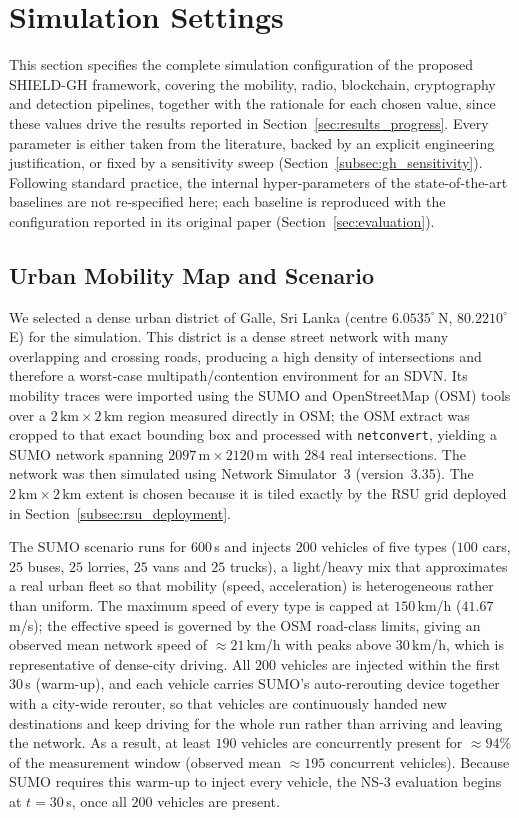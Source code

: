 \documentclass[12pt, a4paper]{report}
\begin{document}
\section{Simulation Settings}
\label{sec:sim_settings}

This section specifies the complete simulation configuration of the proposed
SHIELD-GH framework, covering the mobility, radio, blockchain, cryptography and
detection pipelines, together with the rationale for each chosen value, since
these values drive the results reported in Section~\ref{sec:results_progress}.
Every parameter is either taken from the literature, backed by an explicit
engineering justification, or fixed by a sensitivity sweep
(Section~\ref{subsec:gh_sensitivity}). Following standard practice, the internal
hyper-parameters of the state-of-the-art baselines are not re-specified here;
each baseline is reproduced with the configuration reported in its original
paper (Section~\ref{sec:evaluation}).

\subsection{Urban Mobility Map and Scenario}

We selected a dense urban district of Galle, Sri Lanka (centre
$6.0535^{\circ}$\,N, $80.2210^{\circ}$\,E) for the simulation. This district is
a dense street network with many overlapping and crossing roads, producing a
high density of intersections and therefore a worst-case multipath/contention
environment for an SDVN. Its mobility traces were imported using the SUMO and
OpenStreetMap (OSM) tools over a $2\,\text{km}\times2\,\text{km}$ region
measured directly in OSM; the OSM extract was cropped to that exact bounding
box and processed with \texttt{netconvert}, yielding a SUMO network spanning
$2097\,\text{m}\times2120\,\text{m}$ with $284$ real intersections. The network
was then simulated using Network Simulator~3 (version~3.35). The
$2\,\text{km}\times2\,\text{km}$ extent is chosen because it is tiled exactly by
the RSU grid deployed in Section~\ref{subsec:rsu_deployment}.

The SUMO scenario runs for $600$\,s and injects $200$ vehicles of five types
($100$ cars, $25$ buses, $25$ lorries, $25$ vans and $25$ trucks), a
light/heavy mix that approximates a real urban fleet so that mobility (speed,
acceleration) is heterogeneous rather than uniform. The maximum speed of every
type is capped at $150$\,km/h ($41.67$\,m/s); the effective speed is governed by
the OSM road-class limits, giving an observed mean network speed of
$\approx21$\,km/h with peaks above $30$\,km/h, which is representative of
dense-city driving. All $200$ vehicles are injected within the first $30$\,s
(warm-up), and each vehicle carries SUMO's auto-rerouting device together with
a city-wide rerouter, so that vehicles are continuously handed new destinations
and keep driving for the whole run rather than arriving and leaving the network.
As a result, at least $190$ vehicles are concurrently present for
$\approx94\%$ of the measurement window (observed mean $\approx195$ concurrent
vehicles). Because SUMO requires this warm-up to inject every vehicle, the NS-3
evaluation begins at $t=30$\,s, once all $200$ vehicles are present.
\end{document}
